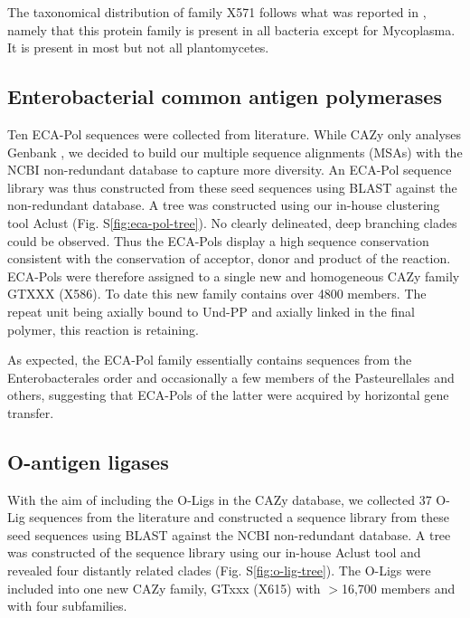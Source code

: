 \documentclass{article}
\begin{document}
The taxonomical distribution of family X571 follows what was reported in \cite{meeske_seds_2016}, namely that this protein family is present in all bacteria except for Mycoplasma. It is present in most but not all plantomycetes.


\subsection{Enterobacterial common antigen polymerases}

Ten ECA-Pol sequences were collected from literature. While CAZy only analyses Genbank \cite{lombard_carbohydrate-active_2014}, we decided to build our multiple sequence alignments (MSAs) with the NCBI non-redundant database to capture more diversity. An ECA-Pol sequence library was thus constructed from these seed sequences using BLAST against the non-redundant database. A tree was constructed using our in-house clustering tool Aclust (Fig. S\ref{fig:eca-pol-tree}). No clearly delineated, deep branching clades could be observed. Thus the ECA-Pols display a high sequence conservation consistent with the conservation of acceptor, donor and product of the reaction. ECA-Pols were therefore assigned to a single new and homogeneous CAZy family GTXXX (X586). To date this new family contains over 4800 members. The repeat unit being axially bound to Und-PP and axially linked in the final polymer, this reaction is retaining.

As expected, the ECA-Pol family essentially contains sequences from the Enterobacterales order and occasionally a few members of the Pasteurellales and others, suggesting that ECA-Pols of the latter were acquired by horizontal gene transfer.

\subsection{O-antigen ligases}
With the aim of including the O-Ligs in the CAZy database, we collected 37 O-Lig sequences from the literature and constructed a sequence library from these seed sequences using BLAST against the NCBI non-redundant database. A tree was constructed of the sequence library using our in-house Aclust tool and revealed four distantly related clades (Fig. S\ref{fig:o-lig-tree}). The O-Ligs were included into one new CAZy family, GTxxx (X615) with $>$16,700 members and with four subfamilies. 
\end{document}
